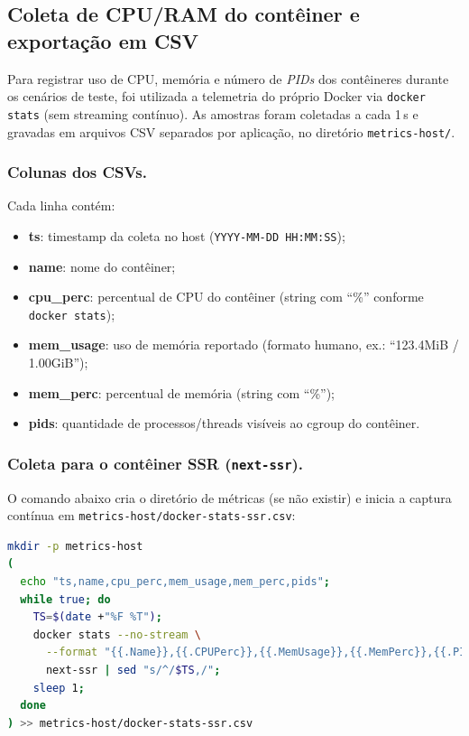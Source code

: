 \subsection{Coleta de CPU/RAM do contêiner e exportação em CSV}
\label{ssec:coleta-host-docker-stats}

Para registrar uso de CPU, memória e número de \textit{PIDs} dos contêineres durante os cenários de teste, foi utilizada a telemetria do próprio Docker via \texttt{docker stats} (sem streaming contínuo). As amostras foram coletadas a cada 1\,s e gravadas em arquivos CSV separados por aplicação, no diretório \texttt{metrics-host/}.

\subsubsection{Colunas dos CSVs.}
Cada linha contém:
\begin{itemize}
  \item \textbf{ts}: timestamp da coleta no host (\texttt{YYYY-MM-DD HH:MM:SS});
  \item \textbf{name}: nome do contêiner;
  \item \textbf{cpu\_perc}: percentual de CPU do contêiner (string com ``\%'' conforme \texttt{docker stats});
  \item \textbf{mem\_usage}: uso de memória reportado (formato humano, ex.: ``123.4MiB / 1.00GiB'');
  \item \textbf{mem\_perc}: percentual de memória (string com ``\%'');
  \item \textbf{pids}: quantidade de processos/threads visíveis ao cgroup do contêiner.
\end{itemize}

\subsubsection{Coleta para o contêiner SSR (\texttt{next-ssr}).}
O comando abaixo cria o diretório de métricas (se não existir) e inicia a captura contínua em \texttt{metrics-host/docker-stats-ssr.csv}:
\begin{lstlisting}[language=bash,caption={Captura de CPU/RAM do contêiner SSR e exportação para CSV}]
mkdir -p metrics-host
(
  echo "ts,name,cpu_perc,mem_usage,mem_perc,pids";
  while true; do
    TS=$(date +"%F %T");
    docker stats --no-stream \
      --format "{{.Name}},{{.CPUPerc}},{{.MemUsage}},{{.MemPerc}},{{.PIDs}}" \
      next-ssr | sed "s/^/$TS,/";
    sleep 1;
  done
) >> metrics-host/docker-stats-ssr.csv
\end{lstlisting}

